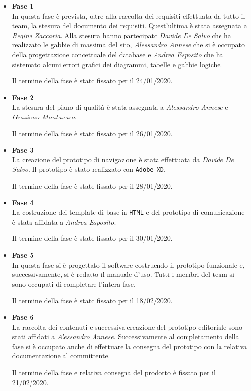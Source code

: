\begin{itemize}
	\item \textbf{Fase 1}\\
	In questa fase è prevista, oltre alla raccolta dei requisiti effettuata da 
	tutto il team, la stesura del documento dei requisiti. Quest'ultima è stata 
	assegnata a \textit{Regina Zaccaria}. Alla stesura hanno partecipato 
	\textit{Davide De Salvo} che ha realizzato le gabbie di massima del sito, 
	\textit{Alessandro Annese} che si è occupato della progettazione 
	concettuale del database e \textit{Andrea Esposito} che ha sistemato alcuni 
	errori grafici dei diagrammi, tabelle e gabbie logiche. 
	
	Il termine della fase è stato fissato per il 24/01/2020.
	\item \textbf{Fase 2}\\
	La stesura del piano di qualità è stata assegnata a \textit{Alessandro 
	Annese} e \textit{Graziano Montanaro}.
	
	Il termine della fase è stato fissato per il 26/01/2020.
	\item \textbf{Fase 3}\\
	La creazione del prototipo di navigazione è stata effettuata da 
	\textit{Davide De Salvo}. Il prototipo è stato realizzato con \texttt{Adobe 
	XD}.
	
	Il termine della fase è stato fissato per il 28/01/2020.
	\item \textbf{Fase 4}\\
	La costruzione dei template di base in \texttt{HTML} e del prototipo di 
	comunicazione è stata affidata a \textit{Andrea Esposito}.
	
	Il termine della fase è stato fissato per il 30/01/2020.
	\item \textbf{Fase 5}\\
	In questa fase si è progettato il software costruendo il prototipo 
	funzionale e, successivamente, si è redatto il manuale d'uso. Tutti i 
	membri del team si sono occupati di completare l'intera fase.
	
	Il termine della fase è stato fissato per il 18/02/2020.
	\item \textbf{Fase 6}\\
	La raccolta dei contenuti e successiva creazione del prototipo editoriale 
	sono stati affidati a \textit{Alessandro Annese}. Successivamente al 
	completamento della fase si è occupato anche di effettuare la consegna del 
	prototipo con la relativa documentazione al committente.
	
	Il termine della fase e relativa consegna del prodotto è fissato per il 
	21/02/2020.
\end{itemize}


